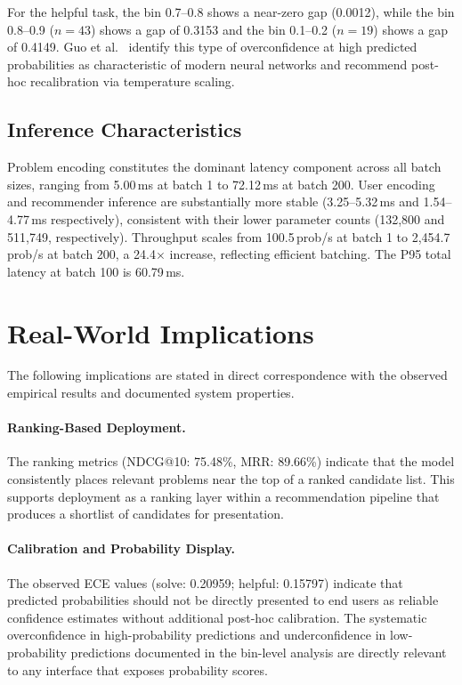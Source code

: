 \documentclass[12pt]{article}
\begin{document}
For the helpful task, the bin 0.7--0.8 shows a near-zero gap (0.0012), while the bin 0.8--0.9 ($n = 43$) shows a gap of 0.3153 and the bin 0.1--0.2 ($n = 19$) shows a gap of 0.4149. Guo et al.\ \cite{guo2017calibration} identify this type of overconfidence at high predicted probabilities as characteristic of modern neural networks and recommend post-hoc recalibration via temperature scaling.

\subsection{Inference Characteristics}

Problem encoding constitutes the dominant latency component across all batch sizes, ranging from 5.00\,ms at batch 1 to 72.12\,ms at batch 200. User encoding and recommender inference are substantially more stable (3.25--5.32\,ms and 1.54--4.77\,ms respectively), consistent with their lower parameter counts (132,800 and 511,749, respectively). Throughput scales from 100.5\,prob/s at batch 1 to 2,454.7\,prob/s at batch 200, a 24.4$\times$ increase, reflecting efficient batching. The P95 total latency at batch 100 is 60.79\,ms.

\section{Real-World Implications}

The following implications are stated in direct correspondence with the observed empirical results and documented system properties.

\paragraph{Ranking-Based Deployment.}
The ranking metrics (NDCG@10: 75.48\%, MRR: 89.66\%) indicate that the model consistently places relevant problems near the top of a ranked candidate list. This supports deployment as a ranking layer within a recommendation pipeline that produces a shortlist of candidates for presentation.

\paragraph{Calibration and Probability Display.}
The observed ECE values (solve: 0.20959; helpful: 0.15797) indicate that predicted probabilities should not be directly presented to end users as reliable confidence estimates without additional post-hoc calibration. The systematic overconfidence in high-probability predictions and underconfidence in low-probability predictions documented in the bin-level analysis are directly relevant to any interface that exposes probability scores.
\end{document}
